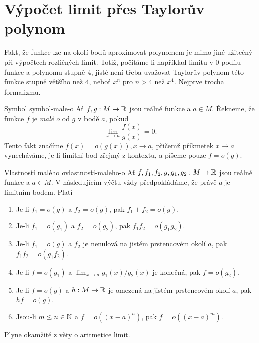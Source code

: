 \section{Výpočet limit přes Taylorův polynom}
\label{sec:vypocet-limit-pres-tayloruv-polynom}

Fakt, že funkce lze na okolí bodů aproximovat polynomem je mimo jiné užitečný
při výpočtech rozličných limit. Totiž, počítáme-li například limitu v $0$ podílu
funkce a polynomu stupně $4$, jistě není třeba uvažovat Taylorův polynom této
funkce stupně většího než $4$, neboť $x^{n}$ pro $n > 4$  než $x^{4}$. Nejprve trocha formalizmu.

\begin{definition}{Symbol }{symbol-male-o}
 Ať $f,g:M \to \mathbb{R}$ jsou reálné funkce a $a \in M$. Řekneme, že funkce $f$ je
 \emph{malé $o$} od $g$ v bodě $a$, pokud
 \[
  \lim_{x \to a} \frac{f(x)}{g(x)} = 0.
 \]
 Tento fakt značíme $f(x) = o(g(x)), x \to a$, přičemž příkmetek $x \to a$
 vynecháváme, je-li limitní bod zřejmý z kontextu, a píšeme pouze $f = o(g)$.
\end{definition}
 
\begin{proposition}{Vlastnosti malého $o$}{vlastnosti-maleho-o}
 Ať $f,f_1,f_2,g,g_1,g_2:M \to \mathbb{R}$ jsou reálné funkce a $a \in M$. V
 následujícím výčtu vždy předpokládáme, že právě $a$ je limitním bodem. Platí
 \begin{enumerate}
  \item Je-li $f_1 = o(g)$ a $f_2 = o(g)$, pak $f_1 + f_2 = o(g)$.
  \item Je-li $f_1 = o(g_1)$ a $f_2 = o(g_2)$, pak $f_1f_2 = o(g_1g_2)$.
  \item Je-li $f_1 = o(g)$ a $f_2$ je nenulová na jistém prstencovém okolí $a$,
   pak $f_1f_2 = o(g_1f_2)$.
  \item Je-li $f = o(g_1)$ a $\lim_{x \to a} g_1(x) / g_2(x)$ je konečná, pak $f
   = o(g_2)$.
  \item Je-li $f = o(g)$ a $h:M \to \mathbb{R}$ je omezená na jistém prstencovém okolí
   $a$, pak $hf = o(g)$.
  \item Jsou-li $m \leq n \in \mathbb{N}$ a $f = o((x-a)^{n})$, pak $f = o((x-a)^{m})$.
 \end{enumerate}
\end{proposition}
\begin{propproof}
 Plyne okamžitě z \hyperref[thm:aritmetika-limit-funkci]{věty o aritmetice
 limit}.
\end{propproof}

